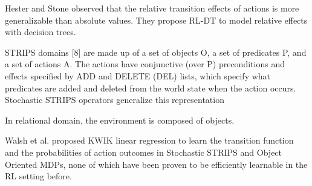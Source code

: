 Hester and Stone \cite{Hester09} observed that the relative transition effects of actions
is more generalizable than absolute values. They propose RL-DT to model relative
effects with decision trees.


STRIPS domains [8] are made up of a set of objects
O, a set of predicates P, and a set of actions A. The
actions have conjunctive (over P) preconditions and
effects specified by ADD and DELETE (DEL) lists,
which specify what predicates are added and deleted
from the world state when the action occurs. Stochastic
STRIPS operators generalize this representation


In relational domain, the environment is composed of objects.

Walsh et al. proposed KWIK linear regression to learn the 
transition function and 
the probabilities of action
outcomes in Stochastic STRIPS and Object
Oriented MDPs, none of which have been
proven to be efficiently learnable in the RL
setting before.









